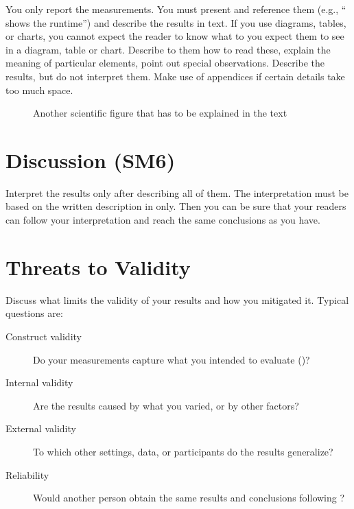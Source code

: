 You only report the measurements.
You must present and reference them (e.g., `` shows the runtime'') and describe the results in text.
If you use diagrams, tables, or charts, you cannot expect the reader to know what to you expect them to see in a diagram, table or chart.
Describe to them how to read these, explain the meaning of particular elements, point out special observations.
Describe the results, but do not interpret them.
Make use of appendices if certain details take too much space.

\begin{figure}
  \centering
  \caption{Another scientific figure that has to be explained in the text}
  \label{fig:my_label2}
\end{figure}

\section{Discussion (SM6)}\label{sec:evaluation:discussion}

Interpret the results only after describing all of them.
The interpretation must be based on the written description in  only.
Then you can be sure that your readers can follow your interpretation and reach the same conclusions as you have.

\section{Threats to Validity}\label{sec:evaluation:threats}

Discuss what limits the validity of your results and how you mitigated it.
Typical questions are:

\begin{description}
  \item[Construct validity] Do your measurements capture what you intended to evaluate ()?
  \item[Internal validity] Are the results caused by what you varied, or by other factors?
  \item[External validity] To which other settings, data, or participants do the results generalize?
  \item[Reliability] Would another person obtain the same results and conclusions following ?
\end{description}
